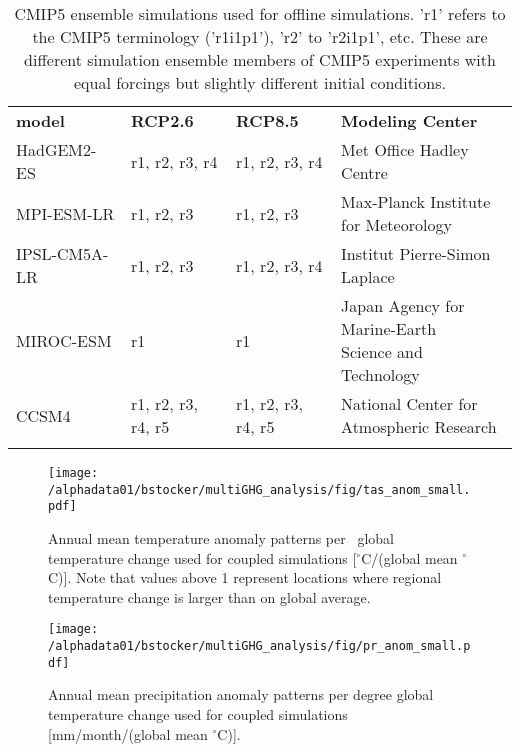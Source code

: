 \begin{table*}[ht!]\footnotesize
\caption[CMIP5 ensemble simulations used for offline simulations]{CMIP5 ensemble simulations used for offline simulations. 'r1' refers to the CMIP5 terminology ('r1i1p1'), 'r2' to 'r2i1p1', etc. These are different simulation ensemble members of CMIP5 experiments with equal forcings but slightly different initial conditions.}
\sffamily
\label{tab:modls}
\centering
\begin{tabular}{llll}
\tophline
\textbf{model} & \textbf{RCP2.6}& \textbf{RCP8.5}  & \textbf{Modeling Center}\\
\middlehline
HadGEM2-ES     & r1, r2, r3, r4 & r1, r2, r3, r4      & Met Office Hadley Centre \\
MPI-ESM-LR     & r1, r2, r3 & r1, r2, r3  & \specialcell[t]{Max-Planck Institute\\ for Meteorology}\\
IPSL-CM5A-LR   & r1, r2, r3 & r1, r2, r3, r4   & Institut Pierre-Simon Laplace\\
MIROC-ESM     &  r1  & r1  & \specialcell[t]{Japan Agency for Marine-Earth\\ Science and Technology} \\
CCSM4         & r1, r2, r3, r4, r5 & r1, r2, r3, r4, r5 & \specialcell[t]{National Center for\\ Atmospheric Research}\\
\bottomhline
\end{tabular}
\end{table*}

\begin{figure}[ht!]
\noindent\texttt{[image: /alphadata01/bstocker/multiGHG\_analysis/fig/tas\_anom\_small.pdf]}
\caption[Annual mean temperature anomaly patterns]{Annual mean temperature anomaly patterns per \degC\ global temperature change used for coupled simulations [$^\circ$C/(global mean $^\circ$C)]. Note that values above 1 represent locations where regional temperature change is larger than on global average.}
\label{fig:tas_anom}
\end{figure}

\begin{figure}[ht!]
\noindent\texttt{[image: /alphadata01/bstocker/multiGHG\_analysis/fig/pr\_anom\_small.pdf]}
\caption[Annual mean precipitation anomaly patterns]{Annual mean precipitation anomaly patterns per degree global temperature change used for coupled simulations [mm/month/(global mean $^\circ$C)].}
\label{fig:pr_anom}
\end{figure}

